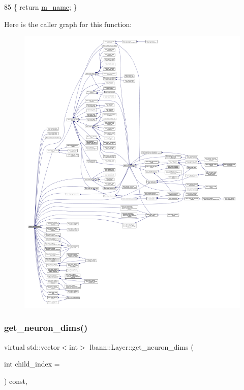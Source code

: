 \begin{DoxyCode}
85 \{ \textcolor{keywordflow}{return} \hyperlink{classlbann_1_1Layer_aa47109ad09b399142fa92f9d3702189f}{m\_name}; \}
\end{DoxyCode}
Here is the caller graph for this function\+:\nopagebreak
\begin{figure}[H]
\begin{center}
\leavevmode
\includegraphics[width=350pt]{classlbann_1_1Layer_a80027550202fa7dbb1dd55fa8a66c84b_icgraph}
\end{center}
\end{figure}
\mbox{\label{classlbann_1_1Layer_a54f53393fadbfdc73b4e72489c868433}} 
\subsubsection{\texorpdfstring{get\+\_\+neuron\+\_\+dims()}{get\_neuron\_dims()}}
{\footnotesize\ttfamily virtual std\+::vector$<$int$>$ lbann\+::\+Layer\+::get\+\_\+neuron\+\_\+dims (\begin{DoxyParamCaption}\item[{int}]{child\+\_\+index = {} }\end{DoxyParamCaption}) const\hspace{0.3cm}{\ttfamily [inline]}, {\ttfamily [virtual]}}

